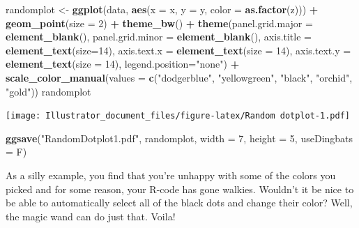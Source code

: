 \documentclass[]{article}
\newenvironment{Shaded}{\begin{snugshade}}{\end{snugshade}}
\newcommand{\KeywordTok}[1]{\textcolor[rgb]{0.13,0.29,0.53}{\textbf{#1}}}
\newcommand{\DataTypeTok}[1]{\textcolor[rgb]{0.13,0.29,0.53}{#1}}
\newcommand{\DecValTok}[1]{\textcolor[rgb]{0.00,0.00,0.81}{#1}}
\newcommand{\StringTok}[1]{\textcolor[rgb]{0.31,0.60,0.02}{#1}}
\newcommand{\OperatorTok}[1]{\textcolor[rgb]{0.81,0.36,0.00}{\textbf{#1}}}
\newcommand{\NormalTok}[1]{#1}
\begin{document}
\begin{Shaded}
\begin{Highlighting}[]
\NormalTok{randomplot <-}\StringTok{ }\KeywordTok{ggplot}\NormalTok{(data, }\KeywordTok{aes}\NormalTok{(}\DataTypeTok{x =}\NormalTok{ x, }\DataTypeTok{y =}\NormalTok{ y, }\DataTypeTok{color =} \KeywordTok{as.factor}\NormalTok{(z))) }\OperatorTok{+}
\StringTok{  }\KeywordTok{geom_point}\NormalTok{(}\DataTypeTok{size =} \DecValTok{2}\NormalTok{) }\OperatorTok{+}
\StringTok{    }\KeywordTok{theme_bw}\NormalTok{() }\OperatorTok{+}\StringTok{ }\KeywordTok{theme}\NormalTok{(}\DataTypeTok{panel.grid.major =} \KeywordTok{element_blank}\NormalTok{(), }
                     \DataTypeTok{panel.grid.minor =} \KeywordTok{element_blank}\NormalTok{(),}
                     \DataTypeTok{axis.title =} \KeywordTok{element_text}\NormalTok{(}\DataTypeTok{size=}\DecValTok{14}\NormalTok{),}
                     \DataTypeTok{axis.text.x =} \KeywordTok{element_text}\NormalTok{(}\DataTypeTok{size =} \DecValTok{14}\NormalTok{),}
                     \DataTypeTok{axis.text.y =} \KeywordTok{element_text}\NormalTok{(}\DataTypeTok{size =} \DecValTok{14}\NormalTok{),}
                     \DataTypeTok{legend.position=}\StringTok{"none"}\NormalTok{) }\OperatorTok{+}
\StringTok{  }\KeywordTok{scale_color_manual}\NormalTok{(}\DataTypeTok{values =} \KeywordTok{c}\NormalTok{(}\StringTok{"dodgerblue"}\NormalTok{, }\StringTok{"yellowgreen"}\NormalTok{, }\StringTok{"black"}\NormalTok{, }\StringTok{"orchid"}\NormalTok{, }\StringTok{"gold"}\NormalTok{))}
\NormalTok{randomplot}
\end{Highlighting}
\end{Shaded}

\texttt{[image: Illustrator\_document\_files/figure-latex/Random dotplot-1.pdf]}

\begin{Shaded}
\begin{Highlighting}[]
\KeywordTok{ggsave}\NormalTok{(}\StringTok{"RandomDotplot1.pdf"}\NormalTok{, randomplot, }\DataTypeTok{width =} \DecValTok{7}\NormalTok{, }\DataTypeTok{height =} \DecValTok{5}\NormalTok{, }\DataTypeTok{useDingbats =}\NormalTok{ F)}
\end{Highlighting}
\end{Shaded}

As a silly example, you find that you're unhappy with some of the colors
you picked and for some reason, your R-code has gone walkies. Wouldn't
it be nice to be able to automatically select all of the black dots and
change their color? Well, the magic wand can do just that. Voila!
\end{document}
